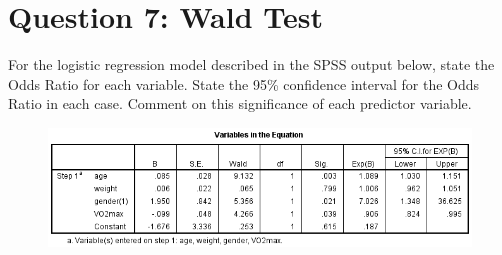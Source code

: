 \documentclass[a4paper,12pt]{article}
\begin{document}
\section*{Question 7: Wald Test}
\noindent
For the logistic regression model described in the SPSS output below, state the Odds Ratio for each variable. State the 95\% confidence interval for the Odds Ratio in each case. Comment on this significance of each predictor variable.
		\begin{figure}[h!]
			\centering
			\includegraphics[width=0.9\linewidth]{images/waldtest}

		\end{figure}
\end{document}
